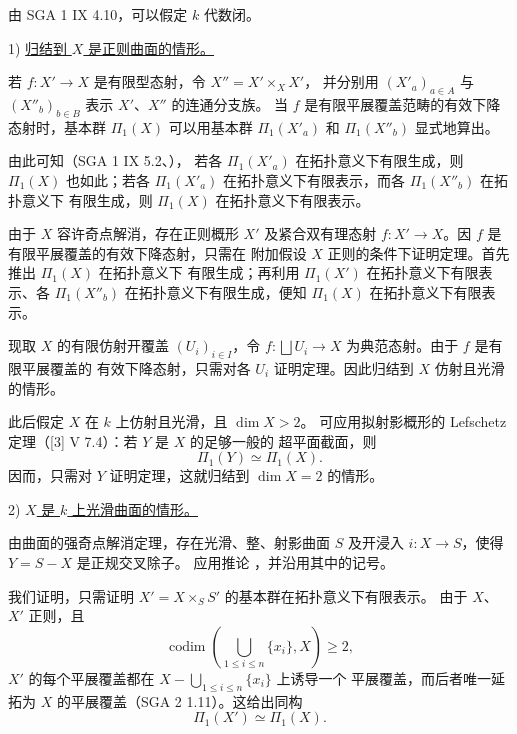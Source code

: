 由 SGA 1 IX 4.10，可以假定 $k$ 代数闭。

1) \underline{归结到 $X$ 是正则曲面的情形。}

若 $f:X'\longrightarrow X$ 是有限型态射，令 $X''=X'\times_X X'$，
并分别用 $(X'_a)_{a\in A}$ 与 $(X''_b)_{b\in B}$ 表示 $X'$、$X''$ 的连通分支族。
当 $f$ 是有限平展覆盖范畴的有效下降态射时，基本群 $\Pi_1(X)$
可以用基本群 $\Pi_1(X'_a)$ 和 $\Pi_1(X''_b)$ 显式地算出。


由此可知（SGA 1 IX 5.2、），
若各 $\Pi_1(X'_a)$ 在拓扑意义下有限生成，则 $\Pi_1(X)$ 也如此；若各
$\Pi_1(X'_a)$ 在拓扑意义下有限表示，而各 $\Pi_1(X''_b)$ 在拓扑意义下
有限生成，则 $\Pi_1(X)$ 在拓扑意义下有限表示。

由于 $X$ 容许奇点解消，存在正则概形 $X'$ 及紧合双有理态射
$f:X'\longrightarrow X$。因 $f$ 是有限平展覆盖的有效下降态射，只需在
附加假设 $X$ 正则的条件下证明定理。首先推出 $\Pi_1(X)$ 在拓扑意义下
有限生成；再利用 $\Pi_1(X')$ 在拓扑意义下有限表示、各 $\Pi_1(X''_b)$
在拓扑意义下有限生成，便知 $\Pi_1(X)$ 在拓扑意义下有限表示。

现取 $X$ 的有限仿射开覆盖 $(U_i)_{i\in I}$，令
$f:\bigsqcup U_i\longrightarrow X$ 为典范态射。由于 $f$ 是有限平展覆盖的
有效下降态射，只需对各 $U_i$ 证明定理。因此归结到 $X$ 仿射且光滑的情形。

此后假定 $X$ 在 $k$ 上仿射且光滑，且 $\dim X>2$。
可应用拟射影概形的 Lefschetz 定理（[3] V 7.4）：若 $Y$ 是 $X$ 的足够一般的
超平面截面，则
\[
 \Pi_1(Y)\simeq\Pi_1(X).
\]
因而，只需对 $Y$ 证明定理，这就归结到 $\dim X=2$ 的情形。

2) \underline{$X$ 是 $k$ 上光滑曲面的情形。}

由曲面的强奇点解消定理，存在光滑、整、射影曲面 $S$ 及开浸入
$i:X\longrightarrow S$，使得 $Y=S-X$ 是正规交叉除子。
应用推论 ，并沿用其中的记号。


我们证明，只需证明 $X'=X\times_S S'$ 的基本群在拓扑意义下有限表示。
由于 $X$、$X'$ 正则，且
\[
 \operatorname{codim}\!\left(\bigcup_{1\leq i\leq n}\{x_i\},X\right)
 \geq 2,
\]
$X'$ 的每个平展覆盖都在 $X-\bigcup_{1\leq i\leq n}\{x_i\}$ 上诱导一个
平展覆盖，而后者唯一延拓为 $X$ 的平展覆盖（SGA 2 1.11）。这给出同构
\[
 \Pi_1(X')\simeq\Pi_1(X).
\]

